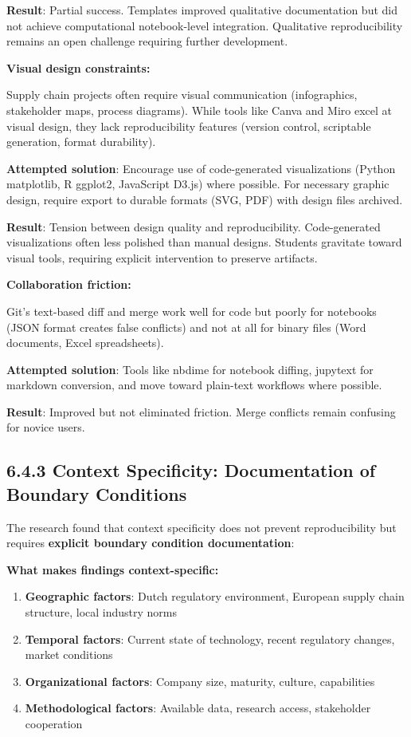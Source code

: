 \documentclass[
  oneside,
  open=any]{scrbook}
\providecommand{\tightlist}{%
  \setlength{\itemsep}{0pt}\setlength{\parskip}{0pt}}\usepackage{longtable,booktabs,array}
\begin{document}
\textbf{Result}: Partial success. Templates improved qualitative
documentation but did not achieve computational notebook-level
integration. Qualitative reproducibility remains an open challenge
requiring further development.

\textbf{Visual design constraints:}

Supply chain projects often require visual communication (infographics,
stakeholder maps, process diagrams). While tools like Canva and Miro
excel at visual design, they lack reproducibility features (version
control, scriptable generation, format durability).

\textbf{Attempted solution}: Encourage use of code-generated
visualizations (Python matplotlib, R ggplot2, JavaScript D3.js) where
possible. For necessary graphic design, require export to durable
formats (SVG, PDF) with design files archived.

\textbf{Result}: Tension between design quality and reproducibility.
Code-generated visualizations often less polished than manual designs.
Students gravitate toward visual tools, requiring explicit intervention
to preserve artifacts.

\textbf{Collaboration friction:}

Git's text-based diff and merge work well for code but poorly for
notebooks (JSON format creates false conflicts) and not at all for
binary files (Word documents, Excel spreadsheets).

\textbf{Attempted solution}: Tools like nbdime for notebook diffing,
jupytext for markdown conversion, and move toward plain-text workflows
where possible.

\textbf{Result}: Improved but not eliminated friction. Merge conflicts
remain confusing for novice users.

\subsection{6.4.3 Context Specificity: Documentation of Boundary
Conditions}\label{context-specificity-documentation-of-boundary-conditions}

The research found that context specificity does not prevent
reproducibility but requires \textbf{explicit boundary condition
documentation}:

\textbf{What makes findings context-specific:}

\begin{enumerate}
\def\labelenumi{\arabic{enumi}.}
\tightlist
\item
  \textbf{Geographic factors}: Dutch regulatory environment, European
  supply chain structure, local industry norms
\item
  \textbf{Temporal factors}: Current state of technology, recent
  regulatory changes, market conditions
\item
  \textbf{Organizational factors}: Company size, maturity, culture,
  capabilities
\item
  \textbf{Methodological factors}: Available data, research access,
  stakeholder cooperation
\end{enumerate}
\end{document}
